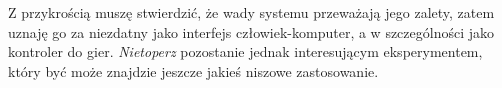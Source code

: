
Z przykrością muszę stwierdzić, że wady systemu przeważają jego zalety, zatem uznaję go za niezdatny jako interfejs człowiek-komputer, a w szczególności jako kontroler do gier. \textsl{Nietoperz} pozostanie jednak interesującym eksperymentem, który być może znajdzie jeszcze jakieś niszowe zastosowanie.